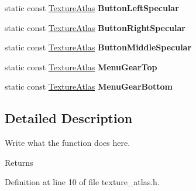 \begin{DoxyCompactItemize}
\item 
\hypertarget{classTextureAtlas_a43bdce582ca4245f963415cbce11de63}{static const \hyperlink{classTextureAtlas}{Texture\+Atlas} {\bfseries Button\+Left\+Specular}}\label{classTextureAtlas_a43bdce582ca4245f963415cbce11de63}

\item 
\hypertarget{classTextureAtlas_aba9ac7217c6089808af6739280ec7779}{static const \hyperlink{classTextureAtlas}{Texture\+Atlas} {\bfseries Button\+Right\+Specular}}\label{classTextureAtlas_aba9ac7217c6089808af6739280ec7779}

\item 
\hypertarget{classTextureAtlas_acc26c58bb000ae76c00d1ea32c98dc15}{static const \hyperlink{classTextureAtlas}{Texture\+Atlas} {\bfseries Button\+Middle\+Specular}}\label{classTextureAtlas_acc26c58bb000ae76c00d1ea32c98dc15}

\item 
\hypertarget{classTextureAtlas_a5cd1596a9c97776e0c1f417567700668}{static const \hyperlink{classTextureAtlas}{Texture\+Atlas} {\bfseries Menu\+Gear\+Top}}\label{classTextureAtlas_a5cd1596a9c97776e0c1f417567700668}

\item 
\hypertarget{classTextureAtlas_a94b67c9b1a5f697574cc17b269575db7}{static const \hyperlink{classTextureAtlas}{Texture\+Atlas} {\bfseries Menu\+Gear\+Bottom}}\label{classTextureAtlas_a94b67c9b1a5f697574cc17b269575db7}

\end{DoxyCompactItemize}


\subsection{Detailed Description}
Write what the function does here. 

\begin{DoxyReturn}{Returns}

\end{DoxyReturn}


Definition at line 10 of file texture\+\_\+atlas.\+h.



